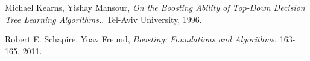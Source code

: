 \documentclass[12 pt, russian]{article}
\begin{document}
\renewcommand{\bibname}{?????? ??????????}
\begin{thebibliography}{15}
 Michael Kearns, Yishay Mansour, \textit{On the Boosting Ability of Top-Down Decision Tree Learning Algorithms.}. Tel-Aviv University,  1996.

Robert E. Schapire, Yoav Freund,\textit{ Boosting: Foundations and Algorithms}. 163-165, 2011.
\end{thebibliography}
\end{document}
